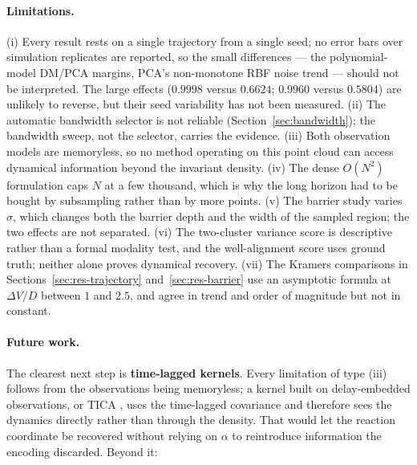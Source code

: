 \documentclass[11pt]{article}
\begin{document}
\paragraph{Limitations.}
(i) Every result rests on a single trajectory from a single seed; no error bars
over simulation replicates are reported, so the small differences --- the
polynomial-model DM/PCA margins, PCA's non-monotone RBF noise trend --- should
not be interpreted. The large effects ($0.9998$ versus $0.6624$; $0.9960$ versus
$0.5804$) are unlikely to reverse, but their seed variability has not been
measured.
(ii) The automatic bandwidth selector is not reliable
(Section~\ref{sec:bandwidth}); the bandwidth sweep, not the selector, carries the
evidence.
(iii) Both observation models are memoryless, so no method operating on this
point cloud can access dynamical information beyond the invariant density.
(iv) The dense $O(N^2)$ formulation caps $N$ at a few thousand, which is why the
long horizon had to be bought by subsampling rather than by more points.
(v) The barrier study varies $\sigma$, which changes both the barrier depth and
the width of the sampled region; the two effects are not separated.
(vi) The two-cluster variance score is descriptive rather than a formal modality
test, and the well-alignment score uses ground truth; neither alone proves
dynamical recovery.
(vii) The Kramers comparisons in Sections~\ref{sec:res-trajectory}
and~\ref{sec:res-barrier} use an asymptotic formula at $\Delta V/D$ between $1$
and $2.5$, and agree in trend and order of magnitude but not in constant.

\paragraph{Future work.}
The clearest next step is \textbf{time-lagged kernels}. Every limitation of type
(iii) follows from the observations being memoryless; a kernel built on
delay-embedded observations, or TICA \citep{perez2013identification}, uses the
time-lagged covariance and therefore sees the dynamics directly rather than
through the density. That would let the reaction coordinate be recovered without
relying on $\alpha$ to reintroduce information the encoding discarded. Beyond it:
\end{document}
